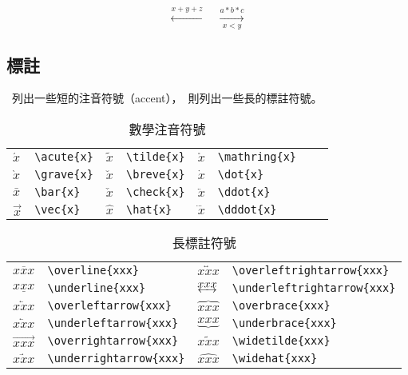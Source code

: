 \begin{demo}
\[\xleftarrow{x+y+z}\quad
\xrightarrow[x<y]{a*b*c}\]
\end{demo}

\subsection{標註}
~列出一些短的注音符號（accent），~則列出一些長的標註符號。

\begin{table}[htbp]
\caption{數學注音符號}
\label{tab:accent}
\centering
\begin{tabular}{llllllll}
    \toprule
    $\acute{x}$ & \verb|\acute{x}| & $\tilde{x}$   & \verb|\tilde{x}|   & $\mathring{x}$   & \verb|\mathring{x}|  \\
    $\grave{x}$ & \verb|\grave{x}| & $\breve{x}$ & \verb|\breve{x}| & $\dot{x}$   & \verb|\dot{x}|    \\
    $\bar{x}$  & \verb|\bar{x}|  & $\check{x}$ & \verb|\check{x}| & $\ddot{x}$  & \verb|\ddot{x}|  \\
    $\vec{x}$ & \verb|\vec{x}| & $\hat{x}$   & \verb|\hat{x}|   & $\dddot{x}$ & \verb|\dddot{x}| \\
    \bottomrule
\end{tabular}
\end{table}

\begin{table}[htbp]
\caption{長標註符號}
\label{tab:notation}
\centering
\begin{tabular}{llll}
    \toprule
    $\overline{xxx}$        & \verb|\overline{xxx}|        & $\overleftrightarrow{xxx}$  & \verb|\overleftrightarrow{xxx}| \\
    $\underline{xxx}$       & \verb|\underline{xxx}|       & $\underleftrightarrow{xxx}$ & \verb|\underleftrightarrow{xxx}| \\
    $\overleftarrow{xxx}$   & \verb|\overleftarrow{xxx}|   & $\overbrace{xxx}$           & \verb|\overbrace{xxx}| \\
    $\underleftarrow{xxx}$  & \verb|\underleftarrow{xxx}|  & $\underbrace{xxx}$          & \verb|\underbrace{xxx}| \\
    $\overrightarrow{xxx}$  & \verb|\overrightarrow{xxx}|  & $\widetilde{xxx}$           & \verb|\widetilde{xxx}| \\
    $\underrightarrow{xxx}$ & \verb|\underrightarrow{xxx}| & $\widehat{xxx}$             & \verb|\widehat{xxx}| \\
    \bottomrule
\end{tabular}
\end{table}

